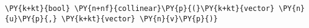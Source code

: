 \begin{Verbatim}[commandchars=\\\{\}]
  \PY{k+kt}{bool} \PY{n+nf}{collinear}\PY{p}{(}\PY{k+kt}{vector} \PY{n}{u}\PY{p}{,} \PY{k+kt}{vector} \PY{n}{v}\PY{p}{)}
\end{Verbatim}
